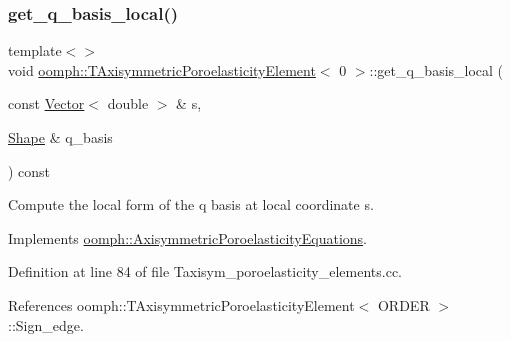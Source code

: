 \mbox{\label{classoomph_1_1TAxisymmetricPoroelasticityElement_ad6ac37a3eabec3e5aab6e7c2e7d65b4e}} 
\subsubsection{\texorpdfstring{get\+\_\+q\+\_\+basis\+\_\+local()}{get\_q\_basis\_local()}\hspace{0.1cm}{\footnotesize\ttfamily [1/3]}}
{\footnotesize\ttfamily template$<$$>$ \\
void \hyperlink{classoomph_1_1TAxisymmetricPoroelasticityElement}{oomph\+::\+T\+Axisymmetric\+Poroelasticity\+Element}$<$ 0 $>$\+::get\+\_\+q\+\_\+basis\+\_\+local (\begin{DoxyParamCaption}\item[{const \hyperlink{classoomph_1_1Vector}{Vector}$<$ double $>$ \&}]{s,  }\item[{\hyperlink{classoomph_1_1Shape}{Shape} \&}]{q\+\_\+basis }\end{DoxyParamCaption}) const\hspace{0.3cm}{\ttfamily [virtual]}}



Compute the local form of the q basis at local coordinate s. 



Implements \hyperlink{classoomph_1_1AxisymmetricPoroelasticityEquations_afe94aaa6d3af8c997c760465b6930c27}{oomph\+::\+Axisymmetric\+Poroelasticity\+Equations}.



Definition at line 84 of file Taxisym\+\_\+poroelasticity\+\_\+elements.\+cc.



References oomph\+::\+T\+Axisymmetric\+Poroelasticity\+Element$<$ O\+R\+D\+E\+R $>$\+::\+Sign\+\_\+edge.

\mbox{\label{classoomph_1_1TAxisymmetricPoroelasticityElement_a2f616b75cf70b2aead5326609ef03c92}} 
